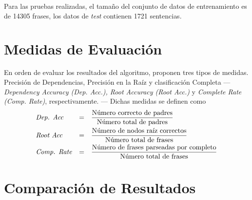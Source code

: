 Para las pruebas realizadas, el tamaño del conjunto de datos de entrenamiento es
de 14305 frases, los datos de \emph{test} contienen 1721 sentencias.

\section{Medidas de Evaluación}
\label{sec:eval}

En orden de evaluar los resultados del algoritmo, \citeauthor{yamada2003}
proponen tres tipos de medidas. Precisión de Dependencias, Precisión en la Raíz
y clasificación Completa --- \emph{Dependency Accuracy (Dep. Acc.), Root
  Accuracy (Root Acc.)} y \emph{Complete Rate (Comp. Rate)},
respectivamente. --- Dichas medidas se definen como
\begin{equation*}
  \begin{aligned}
    & \text{\emph{Dep. Acc}} &=& \quad\frac{\text{Número correcto de padres}}{\text{Número
        total de padres}} \\
    & \text{\emph{Root Acc}} &=& \quad\frac{\text{Número de nodos raíz correctos}}{\text{Número
        total de frases}} \\
    & \text{\emph{Comp. Rate}} &=& \quad\frac{\text{Número de frases
        parseadas por completo}}{\text{Número total de frases}} 
  \end{aligned}
\end{equation*}

\section{Comparación de Resultados}
\label{sec:results}

